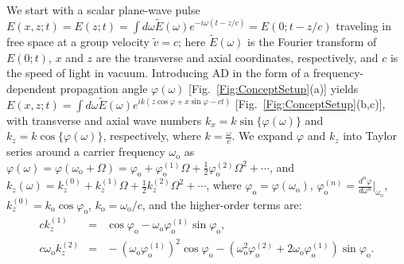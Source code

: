 \documentclass[reprint,
 amsmath,amssymb,
 aps,
]{revtex4-2}
\begin{document}
We start with a scalar plane-wave pulse $E(x,z;t)\!=\!E(z;t)\!=\!\int\!d\omega\widetilde{E}(\omega)e^{-i\omega(t-z/c)}\!=\!E(0;t-z/c)$ traveling in free space at a group velocity $\widetilde{v}\!=\!c$; here $\widetilde{E}(\omega)$ is the Fourier transform of $E(0;t)$, $x$ and $z$ are the transverse and axial coordinates, respectively, and $c$ is the speed of light in vacuum. Introducing AD in the form of a frequency-dependent propagation angle $\varphi(\omega)$ [Fig.~\ref{Fig:ConceptSetup}(a)] yields $E(x,z;t)\!=\!\int\!d\omega\widetilde{E}(\omega)e^{ik(z\cos{\varphi}+x\sin{\varphi}-ct)}$ [Fig.~\ref{Fig:ConceptSetup}(b,c)], with transverse and axial wave numbers $k_{x}\!=\!k\sin\{\varphi(\omega)\}$ and $k_{z}\!=\!k\cos\{\varphi(\omega)\}$, respectively, where $k\!=\!\tfrac{\omega}{c}$. We expand $\varphi$ and $k_{z}$ into Taylor series around a carrier frequency $\omega_{\mathrm{o}}$ as $\varphi(\omega)\!=\!\varphi(\omega_{\mathrm{o}}+\Omega)\!=\!\varphi_{\mathrm{o}}+\varphi_{\mathrm{o}}^{(1)}\Omega+\tfrac{1}{2}\varphi_{\mathrm{o}}^{(2)}\Omega^{2}+\cdots$, and $k_{z}(\omega)\!=\!k_{z}^{(0)}+k_{z}^{(1)}\Omega+\tfrac{1}{2}k_{z}^{(2)}\Omega^{2}+\cdots$, where $\varphi_{\mathrm{o}}\!=\!\varphi(\omega_{\mathrm{o}})$, $\varphi_{\mathrm{o}}^{(n)}\!=\!\tfrac{d^{n}\varphi}{d\omega^{n}}\big|_{\omega_{\mathrm{o}}}$, $k_{z}^{(0)}\!=\!k_{\mathrm{o}}\cos{\varphi_{\mathrm{o}}}$, $k_{\mathrm{o}}\!=\!\omega_{\mathrm{o}}/c$, and the higher-order terms are:
\begin{eqnarray}
ck_{z}^{(1)}\!\!\!\!\!&=&\!\!\!\!\!\cos{\varphi_{\mathrm{o}}}-\omega_{\mathrm{o}}\varphi_{\mathrm{o}}^{(1)}\sin{\varphi_{\mathrm{o}}},\label{Eq:AxialFirstOrderWaveNumber}\\
c\omega_{\mathrm{o}}k_{z}^{(2)}\!\!\!\!\!&=&\!\!\!\!\!-(\omega_{\mathrm{o}}\varphi_{\mathrm{o}}^{(1)})^{2}\cos{\varphi_{\mathrm{o}}}\!-\!(\omega_{\mathrm{o}}^{2}\varphi_{\mathrm{o}}^{(2)}\!+\!2\omega_{\mathrm{o}}\varphi_{\mathrm{o}}^{(1)})\sin{\varphi_{\mathrm{o}}}\label{Eq:AxialGVDCoefficient}.
\end{eqnarray}
\end{document}
